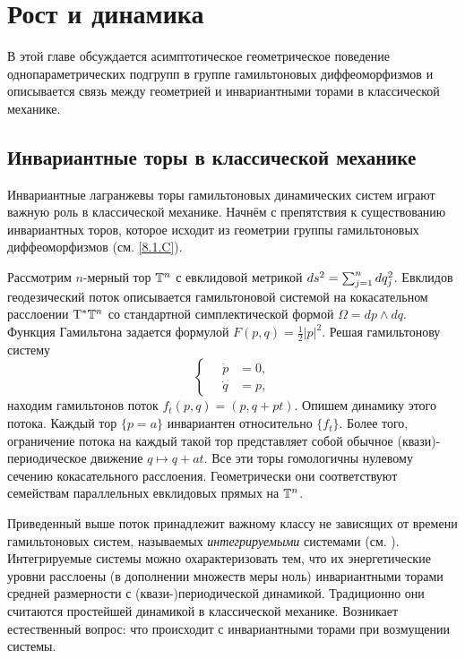 \chapter{Рост и динамика}

В этой главе обсуждается асимптотическое геометрическое поведение
однопараметрических подгрупп в группе гамильтоновых диффеоморфизмов и
описывается связь между геометрией и инвариантными торами в
классической механике. 

\section{Инвариантные торы в классической механике}

Инвариантные лагранжевы торы гамильтоновых динамических систем играют
важную роль в классической механике. 
Начнём с препятствия к существованию инвариантных торов, которое
исходит из геометрии группы гамильтоновых диффеоморфизмов
(см. \ref{8.1.C}). 

Рассмотрим $n$-мерный тор $\mathbb{T}^n$ с евклидовой метрикой $ds^2 \z=
\sum^n_{j = 1} dq_j^2$. 
Евклидов геодезический поток описывается гамильтоновой системой на
кокасательном расслоении $\mathrm{T}^\ast \mathbb{T}^n$ со стандартной симплектической
формой $\Omega = dp \wedge dq$. 
Функция Гамильтона задается формулой $F (p, q) = \tfrac12 | p |^2$.
Решая гамильтонову систему 
\[
\begin{cases}
\quad\dot p &= 0,\\
\quad\dot q &= p,
\end{cases}
\]
находим гамильтонов поток $f_t (p, q) = (p, q + pt)$.
Опишем динамику этого потока.
Каждый тор $\{p = a\}$ инвариантен относительно $\{f_t\}$. 
Более того, ограничение потока на каждый такой тор представляет собой
обычное (квази)-периодическое движение $q \mapsto q + at$. 
Все эти торы гомологичны нулевому сечению кокасательного расслоения.
Геометрически они соответствуют семействам параллельных евклидовых
прямых на $\mathbb{T}^n$. 

Приведенный выше поток принадлежит важному классу не зависящих от
времени гамильтоновых систем, называемых \emph{интегрируемыми} системами
(см. \cite{Ar}). 
Интегрируемые системы можно охарактеризовать тем, что их
энергетические уровни расслоены (в дополнении множеств меры ноль)
инвариантными торами средней размерности с (квази-)периодической
динамикой. 
Традиционно они считаются простейшей динамикой в классической механике.
Возникает естественный вопрос: что происходит с инвариантными торами
при возмущении системы. 

